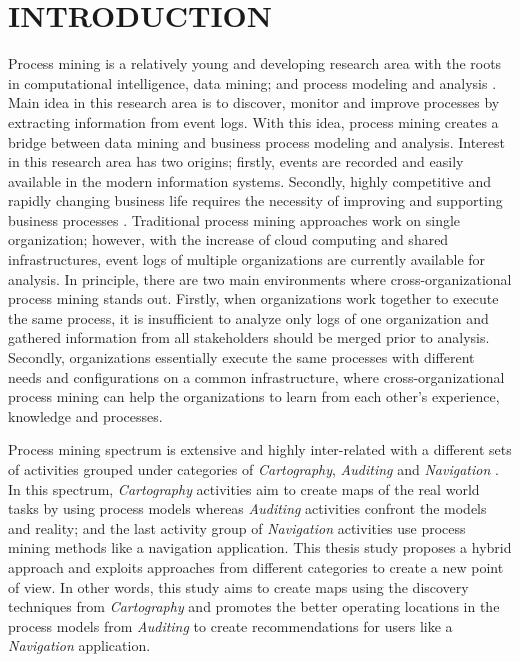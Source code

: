 \chapter{INTRODUCTION}
\label{chp:introduction}

Process mining is a relatively young and developing research area with the roots in computational intelligence, data mining; and process modeling and analysis \cite{van2012process}. Main idea in this research area is to discover, monitor and improve processes by extracting information from event logs. With this idea, process mining creates a bridge between data mining and business process modeling and analysis. Interest in this research area has two origins; firstly, events are recorded and easily available in the modern information systems. Secondly, highly competitive and rapidly changing business life requires the necessity of improving and supporting business processes \cite{van2012process}. Traditional process mining approaches work on single organization; however, with the increase of cloud computing and shared infrastructures, event logs of multiple organizations are currently available for analysis. In principle, there are two main environments where cross-organizational process mining stands out. Firstly, when organizations work together to execute the same process, it is insufficient to analyze only logs of one organization and gathered information from all stakeholders should be merged prior to analysis. Secondly, organizations essentially execute the same processes with different needs and configurations on a common infrastructure, where cross-organizational process mining can help the organizations to learn from each other's experience, knowledge and processes.

Process mining spectrum is extensive and highly inter-related with a different sets of activities grouped under categories of \textit{Cartography}, \textit{Auditing} and \textit{Navigation} \cite{van2011process}. In this spectrum, \textit{Cartography} activities aim to create maps of the real world tasks by using process models whereas \textit{Auditing} activities confront the models and reality; and the last activity group of \textit{Navigation} activities use process mining methods like a navigation application. This thesis study proposes a hybrid approach and exploits approaches from different categories to create a new point of view. In other words, this study aims to create maps using the discovery techniques from \textit{Cartography} and promotes the better operating locations in the process models from \textit{Auditing} to create recommendations for users like a \textit{Navigation} application. 

